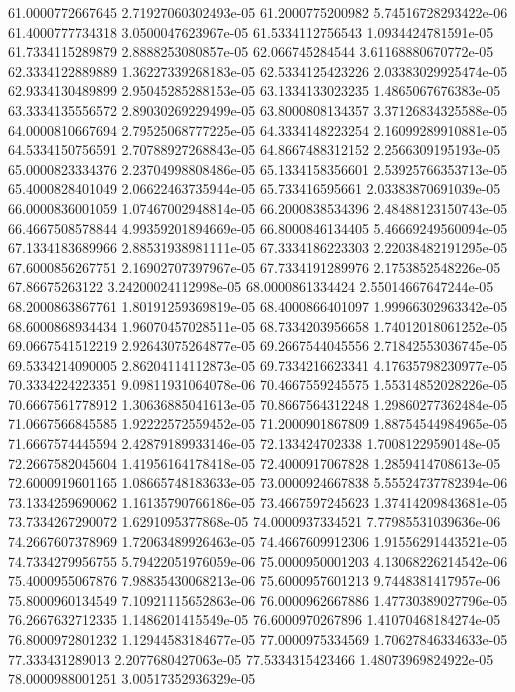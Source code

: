 {61.0000772667645 2.71927060302493e-05
61.2000775200982 5.74516728293422e-06
61.4000777734318 3.0500047623967e-05
61.5334112756543 1.0934424781591e-05
61.7334115289879 2.8888253080857e-05
62.066745284544 3.61168880670772e-05
62.3334122889889 1.36227339268183e-05
62.5334125423226 2.03383029925474e-05
62.9334130489899 2.95045285288153e-05
63.1334133023235 1.4865067676383e-05
63.3334135556572 2.89030269229499e-05
63.8000808134357 3.37126834325588e-05
64.0000810667694 2.79525068777225e-05
64.3334148223254 2.16099289910881e-05
64.5334150756591 2.70788927268843e-05
64.8667488312152 2.2566309195193e-05
65.0000823334376 2.23704998808486e-05
65.1334158356601 2.53925766353713e-05
65.4000828401049 2.06622463735944e-05
65.733416595661 2.03383870691039e-05
66.0000836001059 1.07467002948814e-05
66.2000838534396 2.48488123150743e-05
66.4667508578844 4.99359201894669e-05
66.8000846134405 5.46669249560094e-05
67.1334183689966 2.88531938981111e-05
67.3334186223303 2.22038482191295e-05
67.6000856267751 2.16902707397967e-05
67.7334191289976 2.1753852548226e-05
67.86675263122 3.24200024112998e-05
68.0000861334424 2.55014667647244e-05
68.2000863867761 1.80191259369819e-05
68.4000866401097 1.99966302963342e-05
68.6000868934434 1.96070457028511e-05
68.7334203956658 1.74012018061252e-05
69.0667541512219 2.92643075264877e-05
69.2667544045556 2.71842553036745e-05
69.5334214090005 2.86204114112873e-05
69.7334216623341 4.17635798230977e-05
70.3334224223351 9.09811931064078e-06
70.4667559245575 1.55314852028226e-05
70.6667561778912 1.30636885041613e-05
70.8667564312248 1.29860277362484e-05
71.0667566845585 1.92222572559452e-05
71.2000901867809 1.88754544984965e-05
71.6667574445594 2.42879189933146e-05
72.133424702338 1.70081229590148e-05
72.2667582045604 1.41956164178418e-05
72.4000917067828 1.2859414708613e-05
72.6000919601165 1.08665748183633e-05
73.0000924667838 5.55524737782394e-06
73.1334259690062 1.16135790766186e-05
73.4667597245623 1.37414209843681e-05
73.7334267290072 1.6291095377868e-05
74.0000937334521 7.77985531039636e-06
74.2667607378969 1.72063489926463e-05
74.4667609912306 1.91556291443521e-05
74.7334279956755 5.79422051976059e-06
75.0000950001203 4.13068226214542e-06
75.4000955067876 7.98835430068213e-06
75.6000957601213 9.7448381417957e-06
75.8000960134549 7.10921115652863e-06
76.0000962667886 1.47730389027796e-05
76.2667632712335 1.1486201415549e-05
76.6000970267896 1.41070468184274e-05
76.8000972801232 1.12944583184677e-05
77.0000975334569 1.70627846334633e-05
77.333431289013 2.2077680427063e-05
77.5334315423466 1.48073969824922e-05
78.0000988001251 3.00517352936329e-05
}

